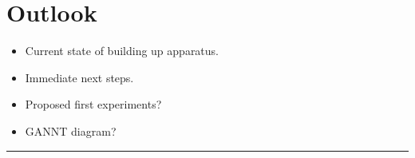\documentclass[12pt]{iopart}
\begin{document}



\section{Outlook}
\begin{itemize}
    \item Current state of building up apparatus.
    \item Immediate next steps.
    \item Proposed first experiments?
    \item GANNT diagram?
\end{itemize}

\hrule
  
\end{document}
